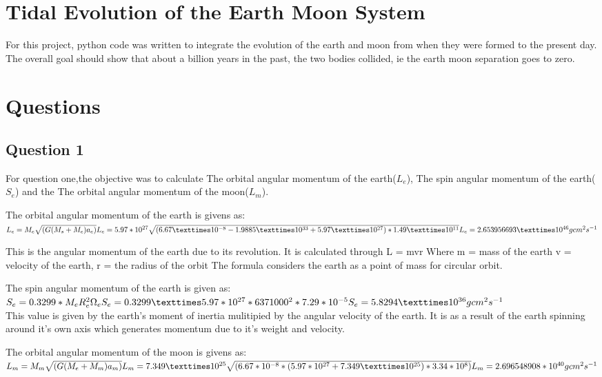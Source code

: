 \documentclass[11pt]{article}
\begin{document}
    
\section{Tidal Evolution of the Earth Moon
System}\label{Introduction}

    For this project, python code was written to integrate the evolution of
the earth and moon from when they were formed to the present day. The
overall goal should show that about a billion years in the past, the two
bodies collided, ie the earth moon separation goes to zero.
\newpage
\section{Questions}
\subsection{Question 1}\label{question-1}

    For question one,the objective was to calculate The orbital angular
momentum of the earth($L_e$), The spin angular momentum of the earth($S_e$)
and the The orbital angular momentum of the moon($L_m$).

The orbital angular momentum of the earth is givens as:\\
$L_e=M_e\sqrt{(G(M_s+M_e)a_e)}\\
L_e=5.97*10^{27}\sqrt{(6.67×10^{-8}-1.9885×10^{33}+5.97×10^{27})*1.49×10^{11}}\\
L_e=2.653956693×10^{46}gcm^2s^{-1}$

This is the angular momentum of the earth due to its revolution. It is
calculated through L = mvr Where m = mass of the earth v = velocity of
the earth, r = the radius of the orbit The formula
considers the earth as a point of mass for circular orbit.

The spin angular momentum of the earth is given as:\\
$S_e=0.3299*M_eR_e^2\Omega_e\\
S_e=0.3299×5.97*10^{27}*6371000^2*7.29*10^{-5}\\
S_e=5.8294×10^{36}gcm^2s^{-1}$\\

This value is given by the
earth's moment of inertia mulitipied by the angular velocity of the
earth. It is as a result of the earth spinning around it's own axis
which generates momentum due to it's weight and velocity.

The orbital angular momentum of the moon is givens as:\\
$L_m=M_m\sqrt{(G(M_e+M_m)a_m)}\\
L_m=7.349×10^{25}\sqrt{(6.67*10^{-8}*(5.97*10^{27}+7.349×10^{25})*3.34*10^8)}\\
L_m=2.696548908*10^{40}gcm^2s^{-1}$
\end{document}
